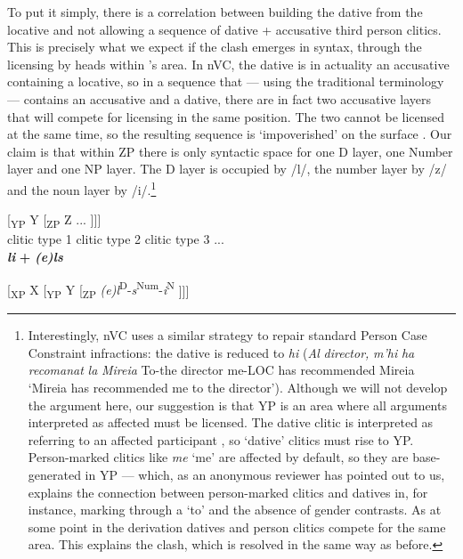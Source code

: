 \documentclass[output=paper,modfonts,nonflat,newtxmath,colorlinks,citecolor=brown]{langsci/langscibook}
\begin{document}
To put it simply, there is a correlation between building the dative from the locative and not allowing a sequence of dative + accusative third person clitics. This is precisely what we expect if the clash emerges in syntax, through the licensing by heads within \citeauthor{Sportiche1996}’s area. In nVC, the dative is in actuality an accusative containing a locative, so in a sequence that — using the traditional terminology — contains an accusative and a dative, there are in fact two accusative layers that will compete for licensing in the same position. The two cannot be licensed at the same time, so the resulting sequence is ‘impoverished’ on the surface . Our claim is that within ZP there is only syntactic space for one D layer, one Number layer and one NP layer. The D layer is occupied by /l/, the number layer by /z/ and the noun layer by /i/.\footnote{Interestingly, nVC uses a similar strategy to repair standard Person Case Constraint infractions: the dative is reduced to \textit{hi} (\textit{Al} \textit{director,} \textit{m’hi} \textit{ha} \textit{recomanat} \textit{la} \textit{Mireia} To-the director me-LOC has recommended Mireia ‘Mireia has recommended me to the director’). Although we will not develop the argument here, our suggestion is that YP is an area where all arguments interpreted as affected must be licensed. The dative clitic is interpreted as referring to an affected participant \citep{AdgerHarbour2007}, so ‘dative’ clitics must rise to YP. Person-marked clitics like \textit{me} ‘me’ are affected by default, so they are base{}-generated in YP — which, as an anonymous reviewer has pointed out to us, explains the connection between person-marked clitics and datives in, for instance, marking through a ‘to’ and the absence of gender contrasts. As at some point in the derivation datives and person clitics compete for the same area. This explains the clash, which is resolved in the same way as before.}

\ea%
    \label{ex:cabre:16}
    \ea \label{ex:cabre:16a}
    \gll {[\textsubscript{XP} X} { } {[\textsubscript{YP} Y} { }  {[\textsubscript{ZP}  Z} ...  ]]]\\
    \footnotesize {clitic type 1} { } \footnotesize {clitic type 2} { } \footnotesize   {clitic type 3} ...\\
    \glt  *\textbf{\textit{li}} \textbf{+} \textit{\textbf{(e)ls}}

    \ex \label{ex:cabre:16b} {[\textsubscript{XP} X}  {[\textsubscript{YP} Y}  {[\textsubscript{ZP}  \textit{(e)l}\textsuperscript{D}-\textit{s}\textsuperscript{Num}-\textit{i}\textsuperscript{N}} ]]]
    \z
\end{document}
